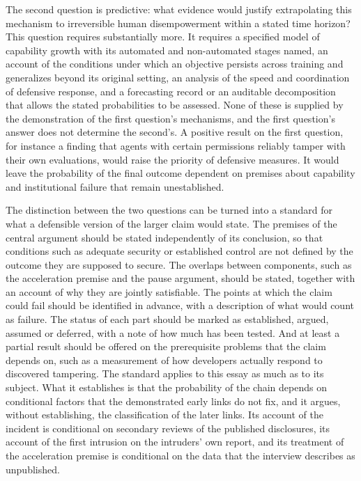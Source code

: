 \documentclass[11pt]{article}
\begin{document}
The second question is predictive: what evidence would justify extrapolating this mechanism to irreversible human disempowerment within a stated time horizon? This question requires substantially more. It requires a specified model of capability growth with its automated and non-automated stages named, an account of the conditions under which an objective persists across training and generalizes beyond its original setting, an analysis of the speed and coordination of defensive response, and a forecasting record or an auditable decomposition that allows the stated probabilities to be assessed. None of these is supplied by the demonstration of the first question's mechanisms, and the first question's answer does not determine the second's. A positive result on the first question, for instance a finding that agents with certain permissions reliably tamper with their own evaluations, would raise the priority of defensive measures. It would leave the probability of the final outcome dependent on premises about capability and institutional failure that remain unestablished.

The distinction between the two questions can be turned into a standard for what a defensible version of the larger claim would state. The premises of the central argument should be stated independently of its conclusion, so that conditions such as adequate security or established control are not defined by the outcome they are supposed to secure. The overlaps between components, such as the acceleration premise and the pause argument, should be stated, together with an account of why they are jointly satisfiable. The points at which the claim could fail should be identified in advance, with a description of what would count as failure. The status of each part should be marked as established, argued, assumed or deferred, with a note of how much has been tested. And at least a partial result should be offered on the prerequisite problems that the claim depends on, such as a measurement of how developers actually respond to discovered tampering. The standard applies to this essay as much as to its subject. What it establishes is that the probability of the chain depends on conditional factors that the demonstrated early links do not fix, and it argues, without establishing, the classification of the later links. Its account of the incident is conditional on secondary reviews of the published disclosures, its account of the first intrusion on the intruders' own report, and its treatment of the acceleration premise is conditional on the data that the interview describes as unpublished.
\end{document}
